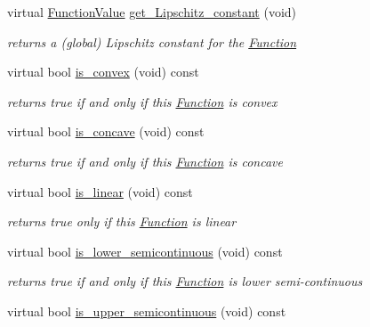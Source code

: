 \begin{Indent}
\begin{DoxyCompactItemize}
virtual \mbox{\hyperlink{class_s_m_spp__di__unipi__it_1_1_function_a9ad432406b609e28d340f73e9474bffe}{Function\+Value}} \mbox{\hyperlink{class_s_m_spp__di__unipi__it_1_1_function_a472422601268368c33568731d4bb0f19}{get\+\_\+\+Lipschitz\+\_\+constant}} (void)
\begin{DoxyCompactList}\small\item\em returns a (global) Lipschitz constant for the \mbox{\hyperlink{class_s_m_spp__di__unipi__it_1_1_function}{Function}} \end{DoxyCompactList}\item 
virtual bool \mbox{\hyperlink{class_s_m_spp__di__unipi__it_1_1_function_a8eac4d4ff5bcf2e564138655ee01ece8}{is\+\_\+convex}} (void) const
\begin{DoxyCompactList}\small\item\em returns true if and only if this \mbox{\hyperlink{class_s_m_spp__di__unipi__it_1_1_function}{Function}} is convex \end{DoxyCompactList}\item 
virtual bool \mbox{\hyperlink{class_s_m_spp__di__unipi__it_1_1_function_a123711e22aabb119629862cf3cb791de}{is\+\_\+concave}} (void) const
\begin{DoxyCompactList}\small\item\em returns true if and only if this \mbox{\hyperlink{class_s_m_spp__di__unipi__it_1_1_function}{Function}} is concave \end{DoxyCompactList}\item 
virtual bool \mbox{\hyperlink{class_s_m_spp__di__unipi__it_1_1_function_a76ad93a7b21d3deb7a917b3cd33d0a9d}{is\+\_\+linear}} (void) const
\begin{DoxyCompactList}\small\item\em returns true only if this \mbox{\hyperlink{class_s_m_spp__di__unipi__it_1_1_function}{Function}} is linear \end{DoxyCompactList}\item 
virtual bool \mbox{\hyperlink{class_s_m_spp__di__unipi__it_1_1_function_a72b5052e29d7f37c9798d9d6d33bd405}{is\+\_\+lower\+\_\+semicontinuous}} (void) const
\begin{DoxyCompactList}\small\item\em returns true if and only if this \mbox{\hyperlink{class_s_m_spp__di__unipi__it_1_1_function}{Function}} is lower semi-\/continuous \end{DoxyCompactList}\item 
virtual bool \mbox{\hyperlink{class_s_m_spp__di__unipi__it_1_1_function_afa2086256b54e80d2dcfd11ad6adcd07}{is\+\_\+upper\+\_\+semicontinuous}} (void) const

\end{DoxyCompactItemize}
\end{Indent}
